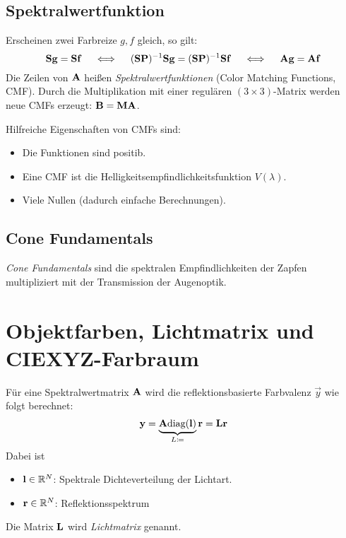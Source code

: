		\subsection{Spektralwertfunktion}
			Erscheinen zwei Farbreize \( g, f \) gleich, so gilt:
			\begin{equation*}
				\boldsymbol{\mathrm{S}} \boldsymbol{\mathrm{g}} = \boldsymbol{\mathrm{S}} \boldsymbol{\mathrm{f}} \quad\iff\quad (\boldsymbol{\mathrm{S}}\boldsymbol{\mathrm{P}})^{-1} \boldsymbol{\mathrm{S}} \boldsymbol{\mathrm{g}} = (\boldsymbol{\mathrm{S}} \boldsymbol{\mathrm{P}})^{-1} \boldsymbol{\mathrm{S}} \boldsymbol{\mathrm{f}} \quad\iff\quad \boldsymbol{\mathrm{A}} \boldsymbol{\mathrm{g}} = \boldsymbol{\mathrm{A}} \boldsymbol{\mathrm{f}}
			\end{equation*}
			Die Zeilen von \( \boldsymbol{\mathrm{A}} \) heißen \emph{Spektralwertfunktionen} (Color Matching Functions, CMF). Durch die Multiplikation mit einer regulären \( (3 \times 3) \)-Matrix werden neue CMFs erzeugt: \( \boldsymbol{\mathrm{B}} = \boldsymbol{\mathrm{M}} \boldsymbol{\mathrm{A}} \).
			
			Hilfreiche Eigenschaften von CMFs sind:
			\begin{itemize}
				\item Die Funktionen sind positib.
				\item Eine CMF ist die Helligkeitsempfindlichkeitsfunktion \( V(\lambda) \).
				\item Viele Nullen (dadurch einfache Berechnungen).
			\end{itemize}

		\subsection{Cone Fundamentals}
			\emph{Cone Fundamentals} sind die spektralen Empfindlichkeiten der Zapfen multipliziert mit der Transmission der Augenoptik.

	\section{Objektfarben, Lichtmatrix und CIEXYZ-Farbraum}
		Für eine Spektralwertmatrix \( \boldsymbol{\mathrm{A}} \) wird die reflektionsbasierte Farbvalenz \( \vec{y} \) wie folgt berechnet:
		\begin{equation*}
			\boldsymbol{\mathrm{y}} = \underbrace{\boldsymbol{\mathrm{A}} \text{diag}(\boldsymbol{\mathrm{l}})}_{L \coloneqq} \boldsymbol{\mathrm{r}} = \boldsymbol{\mathrm{L}} \boldsymbol{\mathrm{r}}
		\end{equation*}
		Dabei ist
		\begin{itemize}
			\item \( \boldsymbol{\mathrm{l}} \in \mathbb{R}^N \): Spektrale Dichteverteilung der Lichtart.
			\item \( \boldsymbol{\mathrm{r}} \in \mathbb{R}^N \): Reflektionsspektrum
		\end{itemize}
		Die Matrix \( \boldsymbol{\mathrm{L}} \) wird \emph{Lichtmatrix} genannt.
		
